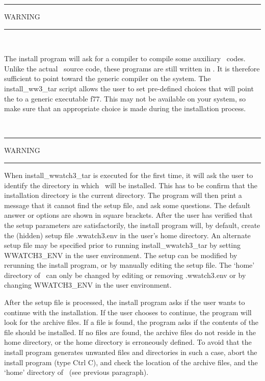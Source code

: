 \begin{center}
\rule[1mm]{55mm}{1.0mm} WARNING \rule[1mm]{55mm}{1.0mm} \\ 
\vspace{\baselineskip}

\parbox{120mm}{The install program will ask for a compiler to compile some
auxiliary \fortran\ codes. Unlike the actual \ws\ source code, these programs
are still written in . It is therefore sufficient to point toward
the generic  compiler on the system. The {\file install\_ww3\_tar}
script allows the user to set pre-defined choices that will point the
 to a generic executable {\file f77}. This may not be available on
your system, so make sure that an appropriate choice is made during the
installation process.}
\\ \vspace{\baselineskip} \rule[1mm]{55mm}{1.0mm}
WARNING \rule[1mm]{55mm}{1.0mm}
\end{center}

When {\file install\_wwatch3\_tar} is executed for the first time, it will ask
the user to identify the directory in which \ws\ will be installed. This has
to be confirm that the installation directory is the current directory. The
program will then print a message that it cannot find the setup file, and ask
some questions. The default answer or options are shown in square
brackets. After the user has verified that the setup parameters are
satisfactorily, the install program will, by default, create the (hidden)
setup file {\file .wwatch3.env} in the user's home directory.  An alternate
setup file may be specified prior to running {\file install\_wwatch3\_tar} by
setting {\code WWATCH3\_ENV} in the user environment.  The setup can be
modified by rerunning the install program, or by manually editing the setup
file. The `home' directory of \ws\ can only be changed by editing or removing
{\file .wwatch3.env} or by changing {\code WWATCH3\_ENV} in the user
environment.

After the setup file is processed, the install program asks if the user wants
to continue with the installation. If the user chooses to continue, the
program will look for the archive files. If a file is found, the program asks
if the contents of the file should be installed. If no files are found, the
archive files do not reside in the home directory, or the home directory is
erroneously defined. To avoid that the install program generates unwanted
files and directories in such a case, abort the install program (type Ctrl C),
and check the location of the archive files, and the `home' directory of \ws\
(see previous paragraph).

